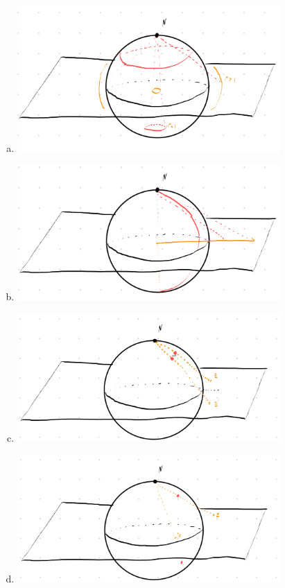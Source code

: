 \documentclass[10pt]{mypackage}
\begin{document}
\begin{solution}[18.18]\hfill
  \begin{enumerate}[(a)]
    \item \hfill
      \begin{center}
        \includegraphics[width=10cm]{images/18_18_a.png}
      \end{center}
    \item \hfill
      \begin{center}
        \includegraphics[width=10cm]{images/18_18_b.png}
      \end{center}
    \item \hfill
      \begin{center}
        \includegraphics[width=10cm]{images/18_18_c.png}
      \end{center}
    \item \hfill
      \begin{center}
        \includegraphics[width=10cm]{images/18_18_d.png}

\end{center}
\end{enumerate}
\end{solution}
\end{document}
